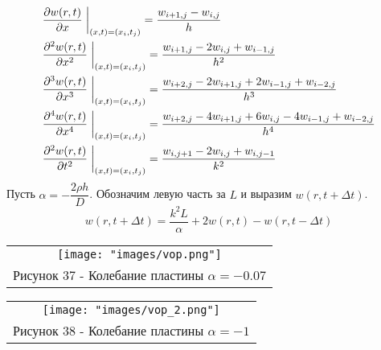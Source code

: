 \begin{align}
  &\dfrac{\partial w(r,t)}{\partial x}\;\bigg|_{(x,t)=(x_i,t_j)}=\dfrac{w_{i+1,j}-w_{i,j}}{h}\notag\\
  &\dfrac{\partial^2 w(r,t)}{\partial x^2}\;\bigg|_{(x,t)=(x_i,t_j)}=\dfrac{w_{i+1,j}-2w_{i,j}+w_{i-1,j}}{h^2}\notag\\
  &\dfrac{\partial^3 w(r,t)}{\partial x^3}\;\bigg|_{(x,t)=(x_i,t_j)}=\dfrac{w_{i+2,j}-2w_{i+1,j}+2w_{i-1,j}+w_{i-2,j}}{h^3}\\
  &\dfrac{\partial^4 w(r,t)}{\partial x^4}\;\bigg|_{(x,t)=(x_i,t_j)}=\dfrac{w_{i+2,j}-4w_{i+1,j}+6w_{i,j}-4w_{i-1,j}+w_{i-2,j}}{h^4}\notag\\
  &\dfrac{\partial^2 w(r,t)}{\partial t^2}\;\bigg|_{(x,t)=(x_i,t_j)}=\dfrac{w_{i,j+1}-2w_{i,j}+w_{i,j-1}}{k^2}\notag
\end{align}
Пусть $\alpha=-\dfrac{2\rho h}{D}$. Обозначим левую часть за $L$ и выразим $w(r,t+\Delta t)$.
\begin{equation}
  w(r,t+\Delta t)=\dfrac{k^2L}{\alpha}+2w(r,t)-w(r,t-\Delta t)
\end{equation}
\begin{center}
  \begin{tabular}{c}
  \texttt{[image: "images/vop.png"]}\\
  Рисунок 37 - Колебание пластины $\alpha=-0.07$
\end{tabular}
\end{center}
\begin{center}
  \begin{tabular}{c}
  \texttt{[image: "images/vop\_2.png"]}\\
  Рисунок 38 - Колебание пластины $\alpha=-1$
\end{tabular}
\end{center}
% 
